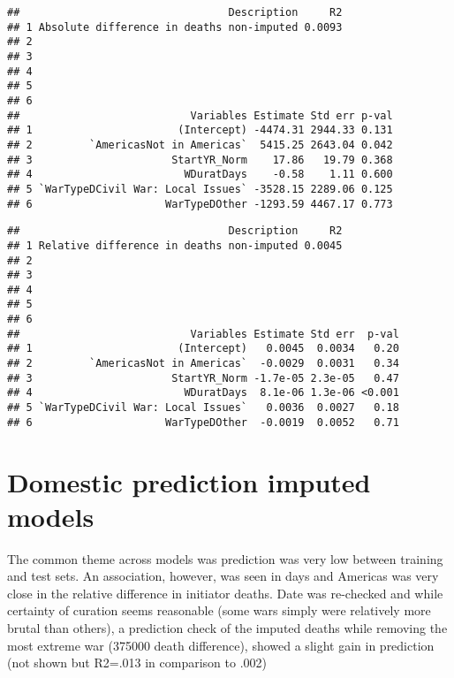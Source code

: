 \documentclass[
]{article}
\begin{document}
\begin{verbatim}
##                                 Description     R2
## 1 Absolute difference in deaths non-imputed 0.0093
## 2                                                 
## 3                                                 
## 4                                                 
## 5                                                 
## 6                                                 
##                           Variables Estimate Std err p-val
## 1                       (Intercept) -4474.31 2944.33 0.131
## 2         `AmericasNot in Americas`  5415.25 2643.04 0.042
## 3                      StartYR_Norm    17.86   19.79 0.368
## 4                        WDuratDays    -0.58    1.11 0.600
## 5 `WarTypeDCivil War: Local Issues` -3528.15 2289.06 0.125
## 6                     WarTypeDOther -1293.59 4467.17 0.773
\end{verbatim}

\begin{verbatim}
##                                 Description     R2
## 1 Relative difference in deaths non-imputed 0.0045
## 2                                                 
## 3                                                 
## 4                                                 
## 5                                                 
## 6                                                 
##                           Variables Estimate Std err  p-val
## 1                       (Intercept)   0.0045  0.0034   0.20
## 2         `AmericasNot in Americas`  -0.0029  0.0031   0.34
## 3                      StartYR_Norm -1.7e-05 2.3e-05   0.47
## 4                        WDuratDays  8.1e-06 1.3e-06 <0.001
## 5 `WarTypeDCivil War: Local Issues`   0.0036  0.0027   0.18
## 6                     WarTypeDOther  -0.0019  0.0052   0.71
\end{verbatim}

\hypertarget{domestic-prediction-imputed-models}{%
\section{Domestic prediction imputed
models}\label{domestic-prediction-imputed-models}}

The common theme across models was prediction was very low between
training and test sets. An association, however, was seen in days and
Americas was very close in the relative difference in initiator deaths.
Date was re-checked and while certainty of curation seems reasonable
(some wars simply were relatively more brutal than others), a prediction
check of the imputed deaths while removing the most extreme war (375000
death difference), showed a slight gain in prediction (not shown but
R2=.013 in comparison to .002)
\end{document}
